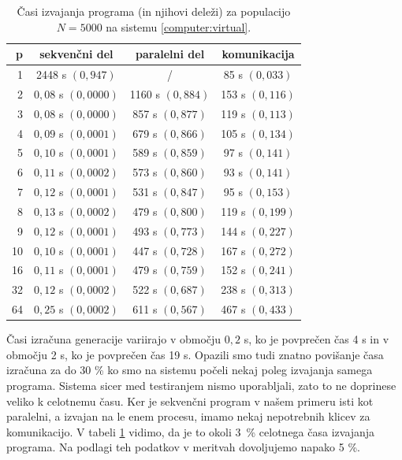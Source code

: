 \documentclass[a4paper,12pt]{book}
\begin{document}
\begin{table}[H]
\centering
\caption{Časi izvajanja programa (in njihovi deleži) za populacijo \mbox{$N = 5000$} na sistemu \ref{computer:virtual}. }
\label{tab:time-ratios}
\begin{tabular}{r | c | c | c}
p & sekvenčni del & paralelni del & komunikacija \\
\hline
1 & 2448 s $(0{,}947)$ & / & 85 s $(0{,}033)$ \\
2 & $0{,}08$ s $(0{,}0000)$ & 1160 s $(0{,}884)$ & 153 s $(0{,}116)$ \\
3 & $0{,}08$ s $(0{,}0000)$ & 857 s $(0{,}877)$ & 119 s $(0{,}113)$ \\
4 & $0{,}09$ s $(0{,}0001)$ & 679 s $(0{,}866)$ & 105 s $(0{,}134)$ \\
5 & $0{,}10$ s $(0{,}0001)$ & 589 s $(0{,}859)$ & 97 s $(0{,}141)$ \\
6 & $0{,}11$ s $(0{,}0002)$ & 573 s $(0{,}860)$ & 93 s $(0{,}141)$ \\
7 & $0{,}12$ s $(0{,}0001)$ & 531 s $(0{,}847)$ & 95 s $(0{,}153)$ \\
8 & $0{,}13$ s $(0{,}0002)$ & 479 s $(0{,}800)$ & 119 s $(0{,}199)$ \\
9 & $0{,}12$ s $(0{,}0001)$ & 493 s $(0{,}773)$ & 144 s $(0{,}227)$ \\
10 & $0{,}10$ s $(0{,}0001)$ & 447 s $(0{,}728)$ & 167 s $(0{,}272)$ \\
16 & $0{,}11$ s $(0{,}0001)$ & 479 s $(0{,}759)$ & 152 s $(0{,}241)$ \\
32 & $0{,}12$ s $(0{,}0002)$ & 522 s $(0{,}687)$ & 238 s $(0{,}313)$ \\
64 & $0{,}25$ s $(0{,}0002)$ & 611 s $(0{,}567)$ & 467 s $(0{,}433)$ \\
\end{tabular}
\end{table}

Časi izračuna generacije variirajo v območju $0{,}2$ s, ko je povprečen čas 4 s in v območju 2 s, ko je povprečen čas 19 s. Opazili smo tudi znatno povišanje časa izračuna za do 30 \% ko smo na sistemu počeli nekaj poleg izvajanja samega programa. Sistema sicer med testiranjem nismo uporabljali, zato to ne doprinese veliko k celotnemu času. Ker je sekvenčni program v našem primeru isti kot paralelni, a izvajan na le enem procesu, imamo nekaj nepotrebnih klicev za komunikacijo. V tabeli \ref{tab:time-ratios} vidimo, da je to okoli \mbox{3 \%} celotnega časa izvajanja programa. Na podlagi teh podatkov v meritvah dovoljujemo napako 5 \%. 
\end{document}
